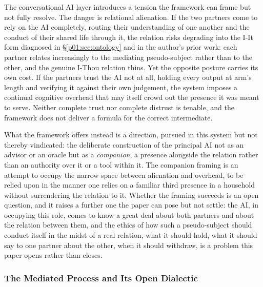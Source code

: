 The conversational AI layer introduces a tension the framework can frame but not fully resolve. The danger is relational alienation. If the two partners come to rely on the AI completely, routing their understanding of one another and the conduct of their shared life through it, the relation risks degrading into the I-It form diagnosed in §\ref{p01:sec:ontology} and in the author's prior work: each partner relates increasingly to the mediating pseudo-subject rather than to the other, and the genuine I-Thou relation thins. Yet the opposite posture carries its own cost. If the partners trust the AI not at all, holding every output at arm's length and verifying it against their own judgement, the system imposes a continual cognitive overhead that may itself crowd out the presence it was meant to serve. Neither complete trust nor complete distrust is tenable, and the framework does not deliver a formula for the correct intermediate.

What the framework offers instead is a direction, pursued in this system but not thereby vindicated: the deliberate construction of the principal AI not as an advisor or an oracle but as a \emph{companion}, a presence alongside the relation rather than an authority over it or a tool within it. The companion framing is an attempt to occupy the narrow space between alienation and overhead, to be relied upon in the manner one relies on a familiar third presence in a household without surrendering the relation to it. Whether the framing succeeds is an open question, and it raises a further one the paper can pose but not settle: the AI, in occupying this role, comes to know a great deal about both partners and about the relation between them, and the ethics of how such a pseudo-subject should conduct itself in the midst of a real relation, what it should hold, what it should say to one partner about the other, when it should withdraw, is a problem this paper opens rather than closes.

\subsubsection{The Mediated Process and Its Open Dialectic}\label{p01:sec:open-dialectic}


